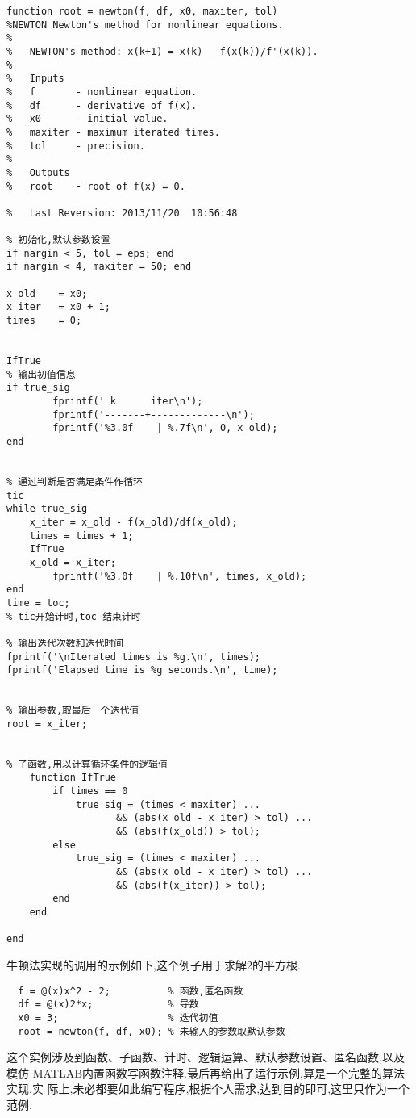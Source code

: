 \begin{lstlisting}[caption = 牛顿法解非线性方程]
function root = newton(f, df, x0, maxiter, tol)
%NEWTON Newton's method for nonlinear equations.
%
%   NEWTON's method: x(k+1) = x(k) - f(x(k))/f'(x(k)).
%
%   Inputs
%   f       - nonlinear equation.
%   df      - derivative of f(x).
%   x0      - initial value.
%   maxiter - maximum iterated times.
%   tol     - precision.
%
%   Outputs
%   root    - root of f(x) = 0.

%   Last Reversion: 2013/11/20  10:56:48

% 初始化,默认参数设置
if nargin < 5, tol = eps; end
if nargin < 4, maxiter = 50; end

x_old    = x0;
x_iter   = x0 + 1;
times    = 0;


IfTrue
% 输出初值信息
if true_sig
        fprintf(' k      iter\n');
        fprintf('-------+-------------\n');
        fprintf('%3.0f    | %.7f\n', 0, x_old);
end


% 通过判断是否满足条件作循环
tic
while true_sig
    x_iter = x_old - f(x_old)/df(x_old);
    times = times + 1;
    IfTrue
    x_old = x_iter;
        fprintf('%3.0f    | %.10f\n', times, x_old);
end
time = toc;
% tic开始计时,toc 结束计时

% 输出迭代次数和迭代时间
fprintf('\nIterated times is %g.\n', times);
fprintf('Elapsed time is %g seconds.\n', time);


% 输出参数,取最后一个迭代值
root = x_iter;


% 子函数,用以计算循环条件的逻辑值
    function IfTrue
        if times == 0
            true_sig = (times < maxiter) ...
                   && (abs(x_old - x_iter) > tol) ...
                   && (abs(f(x_old)) > tol);
        else
            true_sig = (times < maxiter) ...
                   && (abs(x_old - x_iter) > tol) ...
                   && (abs(f(x_iter)) > tol);
        end
    end

end
\end{lstlisting}        

牛顿法实现的调用的示例如下,这个例子用于求解2的平方根.

\vspace{-0.5cm}
\begin{lstlisting}
  f = @(x)x^2 - 2;          % 函数,匿名函数
  df = @(x)2*x;             % 导数
  x0 = 3;                   % 迭代初值
  root = newton(f, df, x0); % 未输入的参数取默认参数
\end{lstlisting}

这个实例涉及到函数、子函数、计时、逻辑运算、默认参数设置、匿名函数,以及模仿
MATLAB内置函数写函数注释.最后再给出了运行示例,算是一个完整的算法实现.实
际上,未必都要如此编写程序,根据个人需求,达到目的即可,这里只作为一个范例.